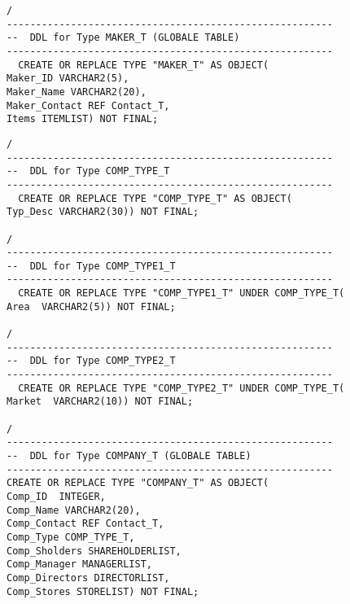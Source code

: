 \documentclass{scrartcl}
\begin{document}
\begin{lstlisting}
/
--------------------------------------------------------
--  DDL for Type MAKER_T (GLOBALE TABLE)
--------------------------------------------------------
  CREATE OR REPLACE TYPE "MAKER_T" AS OBJECT(
Maker_ID VARCHAR2(5),
Maker_Name VARCHAR2(20),
Maker_Contact REF Contact_T,
Items ITEMLIST) NOT FINAL; 
\end{lstlisting}

\begin{lstlisting}
/
--------------------------------------------------------
--  DDL for Type COMP_TYPE_T
--------------------------------------------------------
  CREATE OR REPLACE TYPE "COMP_TYPE_T" AS OBJECT(
Typ_Desc VARCHAR2(30)) NOT FINAL;

/
--------------------------------------------------------
--  DDL for Type COMP_TYPE1_T
--------------------------------------------------------
  CREATE OR REPLACE TYPE "COMP_TYPE1_T" UNDER COMP_TYPE_T(
Area  VARCHAR2(5)) NOT FINAL;

/
--------------------------------------------------------
--  DDL for Type COMP_TYPE2_T
--------------------------------------------------------
  CREATE OR REPLACE TYPE "COMP_TYPE2_T" UNDER COMP_TYPE_T(
Market  VARCHAR2(10)) NOT FINAL;
  
/
--------------------------------------------------------
--  DDL for Type COMPANY_T (GLOBALE TABLE)
--------------------------------------------------------
CREATE OR REPLACE TYPE "COMPANY_T" AS OBJECT(
Comp_ID  INTEGER,
Comp_Name VARCHAR2(20),
Comp_Contact REF Contact_T,
Comp_Type COMP_TYPE_T,
Comp_Sholders SHAREHOLDERLIST,
Comp_Manager MANAGERLIST,
Comp_Directors DIRECTORLIST,
Comp_Stores STORELIST) NOT FINAL;
\end{lstlisting}
\end{document}
